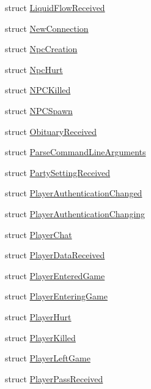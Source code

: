 \begin{DoxyCompactItemize}
\item 
struct \hyperlink{structOTA_1_1Plugin_1_1HookArgs_1_1LiquidFlowReceived}{Liquid\+Flow\+Received}
\item 
struct \hyperlink{structOTA_1_1Plugin_1_1HookArgs_1_1NewConnection}{New\+Connection}
\item 
struct \hyperlink{structOTA_1_1Plugin_1_1HookArgs_1_1NpcCreation}{Npc\+Creation}
\item 
struct \hyperlink{structOTA_1_1Plugin_1_1HookArgs_1_1NpcHurt}{Npc\+Hurt}
\item 
struct \hyperlink{structOTA_1_1Plugin_1_1HookArgs_1_1NPCKilled}{N\+P\+C\+Killed}
\item 
struct \hyperlink{structOTA_1_1Plugin_1_1HookArgs_1_1NPCSpawn}{N\+P\+C\+Spawn}
\item 
struct \hyperlink{structOTA_1_1Plugin_1_1HookArgs_1_1ObituaryReceived}{Obituary\+Received}
\item 
struct \hyperlink{structOTA_1_1Plugin_1_1HookArgs_1_1ParseCommandLineArguments}{Parse\+Command\+Line\+Arguments}
\item 
struct \hyperlink{structOTA_1_1Plugin_1_1HookArgs_1_1PartySettingReceived}{Party\+Setting\+Received}
\item 
struct \hyperlink{structOTA_1_1Plugin_1_1HookArgs_1_1PlayerAuthenticationChanged}{Player\+Authentication\+Changed}
\item 
struct \hyperlink{structOTA_1_1Plugin_1_1HookArgs_1_1PlayerAuthenticationChanging}{Player\+Authentication\+Changing}
\item 
struct \hyperlink{structOTA_1_1Plugin_1_1HookArgs_1_1PlayerChat}{Player\+Chat}
\item 
struct \hyperlink{structOTA_1_1Plugin_1_1HookArgs_1_1PlayerDataReceived}{Player\+Data\+Received}
\item 
struct \hyperlink{structOTA_1_1Plugin_1_1HookArgs_1_1PlayerEnteredGame}{Player\+Entered\+Game}
\item 
struct \hyperlink{structOTA_1_1Plugin_1_1HookArgs_1_1PlayerEnteringGame}{Player\+Entering\+Game}
\item 
struct \hyperlink{structOTA_1_1Plugin_1_1HookArgs_1_1PlayerHurt}{Player\+Hurt}
\item 
struct \hyperlink{structOTA_1_1Plugin_1_1HookArgs_1_1PlayerKilled}{Player\+Killed}
\item 
struct \hyperlink{structOTA_1_1Plugin_1_1HookArgs_1_1PlayerLeftGame}{Player\+Left\+Game}
\item 
struct \hyperlink{structOTA_1_1Plugin_1_1HookArgs_1_1PlayerPassReceived}{Player\+Pass\+Received}

\end{DoxyCompactItemize}
